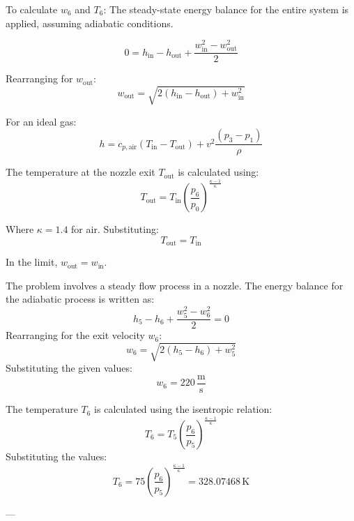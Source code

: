To calculate \( w_6 \) and \( T_6 \):  
The steady-state energy balance for the entire system is applied, assuming adiabatic conditions.  

\[
0 = h_{\text{in}} - h_{\text{out}} + \frac{w_{\text{in}}^2 - w_{\text{out}}^2}{2}
\]

Rearranging for \( w_{\text{out}} \):  
\[
w_{\text{out}} = \sqrt{2(h_{\text{in}} - h_{\text{out}}) + w_{\text{in}}^2}
\]

For an ideal gas:  
\[
h = c_{p,\text{air}}(T_{\text{in}} - T_{\text{out}}) + v^2 \frac{(p_3 - p_1)}{\rho}
\]

The temperature at the nozzle exit \( T_{\text{out}} \) is calculated using:  
\[
T_{\text{out}} = T_{\text{in}} \left(\frac{p_6}{p_0}\right)^{\frac{\kappa - 1}{\kappa}}
\]

Where \( \kappa = 1.4 \) for air. Substituting:  
\[
T_{\text{out}} = T_{\text{in}}
\]

In the limit, \( w_{\text{out}} = w_{\text{in}} \).

The problem involves a steady flow process in a nozzle. The energy balance for the adiabatic process is written as:  
\[
h_5 - h_6 + \frac{w_5^2 - w_6^2}{2} = 0
\]  
Rearranging for the exit velocity \( w_6 \):  
\[
w_6 = \sqrt{2(h_5 - h_6) + w_5^2}
\]  
Substituting the given values:  
\[
w_6 = 220 \, \frac{\text{m}}{\text{s}}
\]  

The temperature \( T_6 \) is calculated using the isentropic relation:  
\[
T_6 = T_5 \left( \frac{p_6}{p_5} \right)^{\frac{\kappa - 1}{\kappa}}
\]  
Substituting the values:  
\[
T_6 = 75 \left( \frac{p_6}{p_5} \right)^{\frac{\kappa - 1}{\kappa}} = 328.07468 \, \text{K}
\]  

---